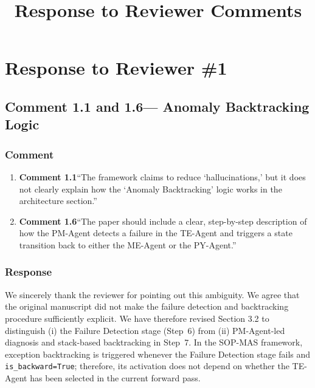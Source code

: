 \documentclass[11pt,a4paper]{article}
\title{Response to Reviewer Comments}
\author{}
\date{}
\begin{document}
\maketitle
\setcounter{tocdepth}{2}
\tableofcontents
\newpage

\section{Response to Reviewer \#1}

\subsection{Comment 1.1 and 1.6--- Anomaly Backtracking Logic}

\subsubsection{Comment}

\begin{enumerate}
  \item \textbf{Comment 1.1}``The framework claims to reduce `hallucinations,' but it does not clearly explain how the `Anomaly Backtracking' logic works in the architecture section.''

  \item \textbf{Comment 1.6}``The paper should include a clear, step-by-step description of how the PM-Agent detects a failure in the TE-Agent and triggers a state transition back to either the ME-Agent or the PY-Agent.''
\end{enumerate}

\subsubsection{Response}
We sincerely thank the reviewer for pointing out this ambiguity. We agree that the original manuscript did not make the failure detection and backtracking procedure sufficiently explicit. We have therefore revised Section 3.2 to distinguish (i) the Failure Detection stage (Step~6) from (ii) PM-Agent-led diagnosis and stack-based backtracking in Step~7. In the SOP-MAS framework, exception backtracking is triggered whenever the Failure Detection stage fails and \texttt{is\_backward=True}; therefore, its activation does not depend on whether the TE-Agent has been selected in the current forward pass.
\end{document}
